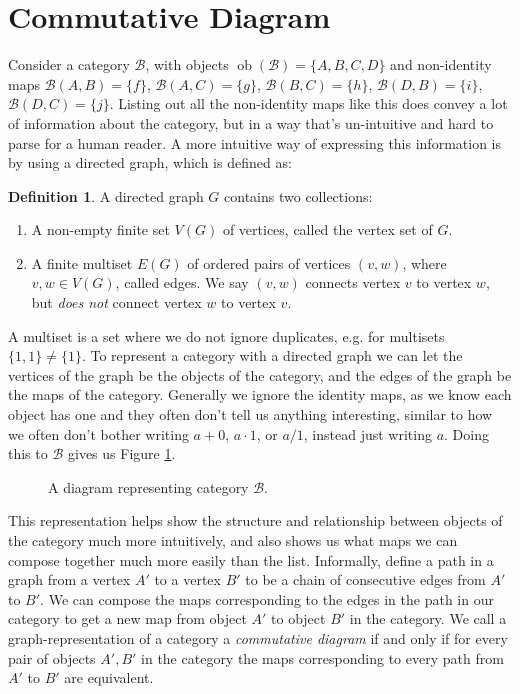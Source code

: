 \documentclass[logo,bsc,singlespacing,parskip]{infthesis}
\theoremstyle{definition}
\newtheorem{defn}[prop]{Definition}
\newcommand{\cat}[1]{\mathscr{#1}}
\newcommand{\ob}[1]{\obj(\mathscr{#1})}
\DeclareMathOperator{\obj}{ob}
\begin{document}
\section{Commutative Diagram}
Consider a category $\cat B$, with objects $\ob{B} = \{A,B,C,D\}$ and non-identity maps $\cat{B}(A,B) = \{f\}$, $\cat{B}(A,C) = \{g\}$, $\cat{B}(B,C) = \{h\}$, $\cat{B}(D,B) = \{i\}$, $\cat{B}(D,C) = \{j\}$. Listing out all the non-identity maps like this does convey a lot of information about the category, but in a way that's un-intuitive and hard to parse for a human reader. A more intuitive way of expressing this information is by using a directed graph, which is defined as:
\begin{defn}
    A directed graph $G$ contains two collections:
    \begin{enumerate}
        \item A non-empty finite set $V(G)$ of vertices, called the vertex set of $G$.
        \item A finite multiset $E(G)$ of ordered pairs of vertices $(v,w)$, where $v, w \in V(G)$, called edges. We say $(v,w)$ connects vertex $v$ to vertex $w$, but \emph{does not} connect vertex $w$ to vertex $v$.
    \end{enumerate}
\end{defn}
A multiset is a set where we do not ignore duplicates, e.g. for multisets $\{1, 1\} \ne \{1\}$. To represent a category with a directed graph we can let the vertices of the graph be the objects of the category, and the edges of the graph be the maps of the category. Generally we ignore the identity maps, as we know each object has one and they often don't tell us anything interesting, similar to how we often don't bother writing $a + 0$, $a \cdot 1$, or $a/1$, instead just writing $a$. Doing this to $\cat B$ gives us Figure \ref{fig:comm-diag-ex1}. 

\begin{figure}[h]
    \centering
    \caption{A diagram representing category $\cat B$.}
    \label{fig:comm-diag-ex1}
\end{figure}

This representation helps show the structure and relationship between objects of the category much more intuitively, and also shows us what maps we can compose together much more easily than the list. Informally, define a path in a graph from a vertex $A'$ to a vertex $B'$ to be a chain of consecutive edges from $A'$ to $B'$. We can compose the maps corresponding to the edges in the path in our category to get a new map from object $A'$ to object $B'$ in the category. We call a graph-representation of a category a \emph{commutative diagram} if and only if for every pair of objects $A', B'$ in the category the maps corresponding to every path from $A'$ to $B'$ are equivalent.
\end{document}
